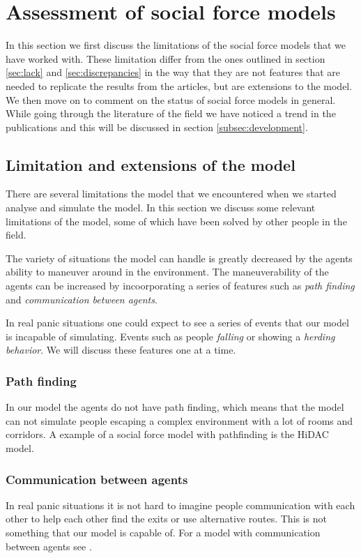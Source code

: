 \section{Assessment of social force models}
\label{sec:assessment}
In this section we first discuss the limitations of the social force models 
that we have worked with. These limitation differ from the ones outlined in 
section \ref{sec:lack} and \ref{sec:discrepancies} in the way that 
they are not features that are needed to replicate the results from the articles, 
but are extensions to the model. We then move on to comment on the status of 
social force models in general.
While going through the literature of the field we have noticed a trend in the 
publications and this will be discussed in section \ref{subsec:development}.

\subsection{Limitation and extensions of the model}
There are several limitations the model that we encountered when we started 
analyse and simulate the model. In this section we discuss some relevant 
limitations of the model, some of which have been solved by other people in the 
field. 

The variety of situations the model can handle is greatly decreased by the 
agents ability to maneuver around in the environment. The maneuverability of 
the agents can be increased by incoorporating a series of features such as 
\emph{path finding} and \emph{communication between agents}. 

In real panic situations one could expect to see a series of events that our 
model is incapable of simulating. Events such as people \emph{falling} or showing a 
\emph{herding behavior}. We will discuss these features one at a time.

\subsubsection{Path finding}
In our model the agents do not have path finding, which means that the model 
can not simulate people escaping a complex environment with a lot of rooms 
and corridors. A example of a social force model with pathfinding is the HiDAC 
model\cite{HiDAC}.

\subsubsection{Communication between agents}
In real panic situations it is not hard to imagine people communication with 
each other to help each other find the exits or use alternative routes. This is 
not something that our model is capable of. For a model with communication between 
agents see \cite{HiDAC}.


